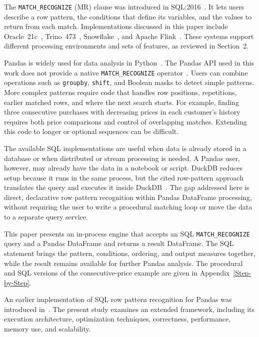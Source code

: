 \documentclass[preprint,12pt,times,a4paper]{elsarticle}
\begin{document}
The \texttt{MATCH\_RECOGNIZE} (MR) clause was introduced in
SQL:2016~\cite{iso9075_2_2016,ISO2021}. It lets users describe a row pattern, the
conditions that define its variables, and the values to return from each match.
Implementations discussed in this paper include Oracle~21c~\cite{oracle2022,book},
Trino~473~\cite{trino2022,trino2021row},
Snowflake~\cite{snowflake2025match_recognize}, and Apache
Flink~\cite{flink}. These systems support different processing environments and
sets of features, as reviewed in Section~2.

Pandas is widely used for data analysis in Python~\cite{McKinney2010}.
The Pandas API used in this work does not provide a native
\texttt{MATCH\_RECOGNIZE} operator~\cite{pandas233api}.
Users can combine operations such as \texttt{groupby}, \texttt{shift}, and
Boolean masks to detect simple patterns. More complex patterns require code
that handles row positions, repetitions, earlier matched rows, and where the
next search starts. For example, finding three consecutive purchases with
decreasing prices in each customer's history requires both price comparisons
and control of overlapping matches. Extending this code to longer or optional
sequences can be difficult.

The available SQL implementations are useful when data is already stored in a
database or when distributed or stream processing is needed. A Pandas user,
however, may already have the data in a notebook or script. DuckDB reduces
setup because it runs in the same process, but the cited row-pattern approach
translates the query and executes it inside
DuckDB~\cite{lambrecht2025democratize}. The gap addressed here is direct,
declarative row pattern recognition within Pandas DataFrame processing,
without requiring the user to write a procedural matching loop or move the
data to a separate query service.

This paper presents an in-process engine that accepts an SQL
\texttt{MATCH\_RECOGNIZE} query and a Pandas DataFrame and returns a result
DataFrame. The SQL statement brings the pattern, conditions, ordering, and
output measures together, while the result remains available for further
Pandas analysis. The procedural and SQL versions of the consecutive-price
example are given in Appendix~\ref{Step-by-Step}.

An earlier implementation of SQL row pattern recognition for Pandas was
introduced in~\cite{lawande2026rpr}. The present study examines an extended
framework, including its execution architecture, optimization techniques,
correctness, performance, memory use, and scalability.
\end{document}
